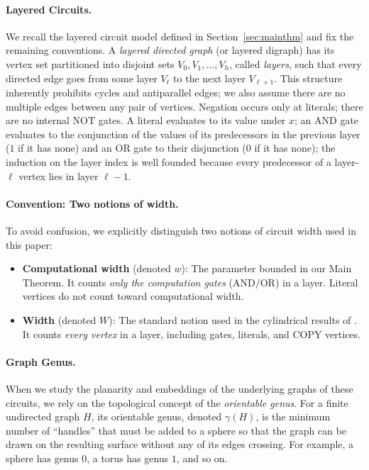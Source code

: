 \documentclass[11pt]{article}
\theoremstyle{definition}
\theoremstyle{remark}
\newcommand{\genus}{\gamma}
\begin{document}
\paragraph{Layered Circuits.}
We recall the layered circuit model defined in Section~\ref{sec:mainthm} and fix the remaining conventions. A \emph{layered directed graph} (or layered digraph) has its vertex set partitioned into disjoint sets $V_0, V_1, \dots, V_h$, called \emph{layers}, such that every directed edge goes from some layer $V_\ell$ to the next layer $V_{\ell+1}$. This structure inherently prohibits cycles and antiparallel edges; we also assume there are no multiple edges between any pair of vertices. Negation occurs only at literals; there are no internal $\mathrm{NOT}$ gates. A literal evaluates to its value under $x$; an $\mathrm{AND}$ gate evaluates to the conjunction of the values of its predecessors in the previous layer ($1$ if it has none) and an $\mathrm{OR}$ gate to their disjunction ($0$ if it has none); the induction on the layer index is well founded because every predecessor of a layer-$\ell$ vertex lies in layer $\ell-1$.

\paragraph{Convention: Two notions of width.}
To avoid confusion, we explicitly distinguish two notions of circuit width used in this paper:
\begin{itemize}
    \item \textbf{Computational width} (denoted $w$): The parameter bounded in our Main Theorem. It counts \emph{only the computation gates} ($\mathrm{AND}/\mathrm{OR}$) in a layer. Literal vertices do not count toward computational width.
    \item \textbf{Width} (denoted $W$): The standard notion used in the cylindrical results of \cite{Hansen03,HMV02}. It counts \emph{every vertex} in a layer, including gates, literals, and $\mathrm{COPY}$ vertices.
\end{itemize}

\paragraph{Graph Genus.}
When we study the planarity and embeddings of the underlying graphs of these circuits, we rely on the topological concept of the \emph{orientable genus}. For a finite undirected graph $H$, its orientable genus, denoted $\genus(H)$, is the minimum number of ``handles'' that must be added to a sphere so that the graph can be drawn on the resulting surface without any of its edges crossing. For example, a sphere has genus $0$, a torus has genus $1$, and so on.
\end{document}
